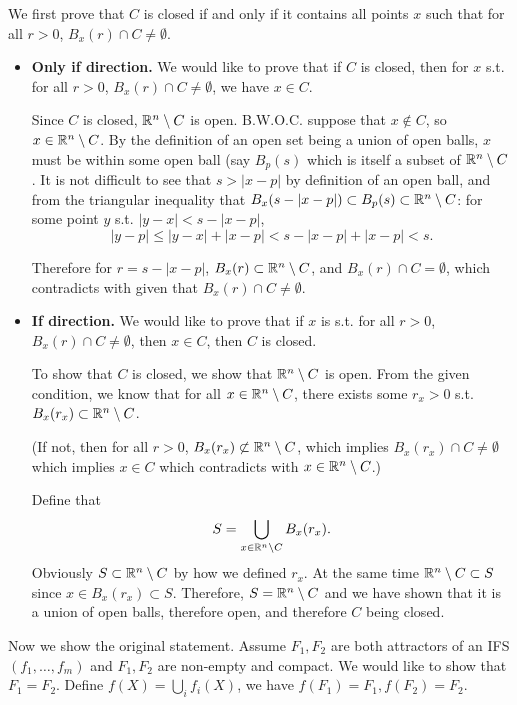 We first prove that \(C\) is closed if and only if it contains all points \(x\) such that for all \(r > 0\), \(B_x(r) \cap C \neq \emptyset\).

\begin{itemize}
    \item \textbf{Only if direction.} We would like to prove that if \(C\) is closed, then for \(x\) s.t. for all \(r > 0\), \(B_x(r) \cap C \neq \emptyset\), we have \(x \in C\).

    Since \(C\) is closed, \(\mathbb{R}^n \setminus C\) is open. B.W.O.C. suppose that \(x \notin C\), so \(x \in \mathbb{R}^n \setminus C\). By the definition of an open set being a union of open balls, \(x\) must be within some open ball (say \(B_p(s)\) which is itself a subset of \(\mathbb{R}^n \setminus C\). It is not difficult to see that \(s > |x - p|\) by definition of an open ball, and from the triangular inequality that \(B_x(s - |x - p|) \subset B_p(s) \subset \mathbb{R}^n \setminus C\): for some point \(y\) s.t. \(|y - x| < s - |x - p|\),
    \[|y - p| \leq |y - x| + |x - p| < s - |x - p| + |x - p| < s.\]

    Therefore for \(r = s - |x - p|\), \(B_x(r) \subset \mathbb{R}^n \setminus C\), and \(B_x(r) \cap C = \emptyset\), which contradicts with given that \(B_x(r) \cap C \neq \emptyset\).

    \item \textbf{If direction.} We would like to prove that if \(x\) is s.t. for all \(r > 0\), \(B_x(r) \cap C \neq \emptyset\), then \(x \in C\), then \(C\) is closed.

    To show that \(C\) is closed, we show that \(\mathbb{R}^n \setminus C\) is open. From the given condition, we know that for all \(x \in \mathbb{R}^n \setminus C\), there exists some \(r_x > 0\) s.t. \(B_x(r_x) \subset \mathbb{R}^n \setminus C\).
    
    (If not, then for all \(r > 0\), \(B_x(r_x) \not\subset \mathbb{R}^n \setminus C\), which implies \(B_x(r_x) \cap C \neq \emptyset\) which implies \(x \in C\) which contradicts with \(x \in \mathbb{R}^n \setminus C\).)
    
    Define that
    \[
        S = \bigcup_{x \in \mathbb{R}^n \setminus C} B_x (r_x).
    \]
    Obviously \(S \subset \mathbb{R}^n \setminus C\) by how we defined \(r_x\). At the same time \(\mathbb{R}^n\setminus C \subset S\) since \(x \in B_x(r_x) \subset S\). Therefore, \(S = \mathbb{R}^n \setminus C\) and we have shown that it is a union of open balls, therefore open, and therefore \(C\) being closed.
\end{itemize}

Now we show the original statement. Assume \(F_1, F_2\) are both attractors of an IFS \((f_1, \ldots, f_m)\) and \(F_1, F_2\) are non-empty and compact. We would like to show that \(F_1 = F_2\). Define \(f(X) = \bigcup_i f_i(X)\), we have \(f(F_1) = F_1, f(F_2) = F_2\).